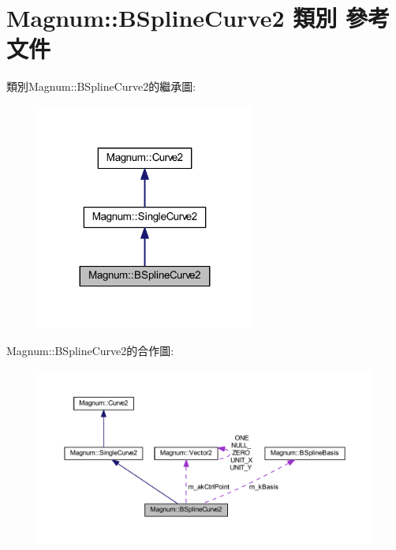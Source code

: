 \hypertarget{class_magnum_1_1_b_spline_curve2}{}\section{Magnum\+:\+:B\+Spline\+Curve2 類別 參考文件}
\label{class_magnum_1_1_b_spline_curve2}


類別\+Magnum\+:\+:B\+Spline\+Curve2的繼承圖\+:\nopagebreak
\begin{figure}[H]
\begin{center}
\leavevmode
\includegraphics[width=203pt]{class_magnum_1_1_b_spline_curve2__inherit__graph}
\end{center}
\end{figure}


Magnum\+:\+:B\+Spline\+Curve2的合作圖\+:\nopagebreak
\begin{figure}[H]
\begin{center}
\leavevmode
\includegraphics[width=350pt]{class_magnum_1_1_b_spline_curve2__coll__graph}
\end{center}
\end{figure}
